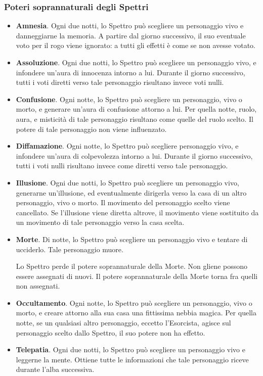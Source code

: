 \documentclass[a4paper,10pt]{article}
\begin{document}
\subsubsection*{Poteri soprannaturali degli Spettri}

\begin{itemize}

	\item {\bf Amnesia}. Ogni due notti, lo Spettro può scegliere un personaggio vivo e danneggiarne la memoria. A partire dal giorno successivo, il suo eventuale voto per il rogo viene ignorato: a tutti gli effetti è come se non avesse votato.
 
	\item {\bf Assoluzione}. Ogni due notti, lo Spettro può scegliere un personaggio vivo, e infondere un'aura di innocenza intorno a lui. Durante il giorno successivo, tutti i voti diretti verso tale personaggio risultano invece voti nulli.
	
	\item {\bf Confusione}. Ogni notte, lo Spettro può scegliere un personaggio, vivo o morto, e generare un'aura di confusione attorno a lui. Per quella notte, ruolo, aura, e misticità di tale personaggio risultano come quelle del ruolo scelto. Il potere di tale personaggio non viene influenzato.

	\item {\bf Diffamazione}. Ogni notte, lo Spettro può scegliere personaggio vivo, e infondere un'aura di colpevolezza intorno a lui. Durante il giorno successivo, tutti i voti nulli risultano invece come diretti verso tale personaggio.
	
	\item {\bf Illusione}. Ogni due notti, lo Spettro può scegliere un personaggio vivo, generarne un'illusione, ed eventualmente dirigerla verso la casa di un altro personaggio, vivo o morto. Il movimento del personaggio scelto viene cancellato. Se l'illusione viene diretta altrove, il movimento viene sostituito da un movimento di tale personaggio verso la casa scelta.
	
	\item {\bf Morte}. Di notte, lo Spettro può scegliere un personaggio vivo e tentare di ucciderlo. Tale personaggio muore.
 
	Lo Spettro perde il potere soprannaturale della Morte. Non gliene possono essere assegnati di nuovi. Il potere soprannaturale della Morte torna fra quelli non assegnati.
 
	\item {\bf Occultamento}. Ogni notte, lo Spettro può scegliere un personaggio, vivo o morto, e creare attorno alla sua casa una fittissima nebbia magica. Per quella notte, se un qualsiasi altro personaggio, eccetto l'Esorcista, agisce sul personaggio scelto dallo Spettro, il suo potere non ha effetto.
	
	\item {\bf Telepatia}. Ogni due notti, lo Spettro può scegliere un personaggio vivo e leggerne la mente. Ottiene tutte le informazioni che tale personaggio riceve durante l'alba successiva.
 
\end{itemize}
\end{document}
